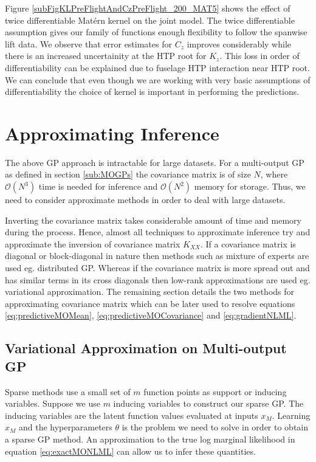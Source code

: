 Figure \ref{subFigKLPreFlightAndCzPreFlight_200_MAT5} shows the effect of twice differentiable Mat\'ern kernel on the joint model. The twice differentiable assumption gives our family of functions enough flexibility to follow the spanwise lift data. We observe that error estimates for \(C_{z}\) improves considerably while there is an increased uncertainity at the HTP root for \(K_{z}\). This loss in order of differentiability can be explained due to fuselage HTP interaction near HTP root. We can conclude that even though we are working with very basic assumptions of differentiability the choice of kernel is important in performing the predictions. 


\section{Approximating Inference}\label{sec:sparseGPRegression}
\noindent The above GP approach is intractable for large datasets. For a multi-output GP as defined in section \ref{sub:MOGPs} the covariance matrix is of size \(N\),  where \(\mathcal{O}\left ( N^{3} \right )\) time is needed for inference and \(\mathcal{O}\left ( N^{2} \right )\) memory for storage. Thus, we need to consider approximate methods in order to deal with large datasets. 

Inverting the covariance matrix takes considerable amount of time and memory during the process. Hence, almost all techniques to approximate inference try and approximate the inversion of covariance matrix \(K_{XX}\). If a covariance matrix is diagonal or block-diagonal in nature then methods such as mixture of experts are used eg. distributed GP. Whereas if the covariance matrix is more spread out and has similar terms in its cross diagonals then low-rank approximations are used eg. variational approximation. The remaining section details the two methods for approximating covariance matrix which can be later used to resolve equations \ref{eq:predictiveMOMean}, \ref{eq:predictiveMOCovariance} and \ref{eq:gradientNLML}.

\subsection{Variational Approximation on Multi-output GP}\label{sec:varMOGP}
Sparse methods use a small set of \(m\) function points as support or inducing variables. Suppose we use \(m\) inducing variables to construct our sparse GP. The inducing variables are the latent function values evaluated at inputs \(x_{M}\). Learning \(x_{M}\) and the hyperparameters \(\theta\) is the problem we need to solve in order to obtain a sparse GP method. An approximation to the true log marginal likelihood in equation \ref{eq:exactMONLML} can allow us to infer these quantities.

